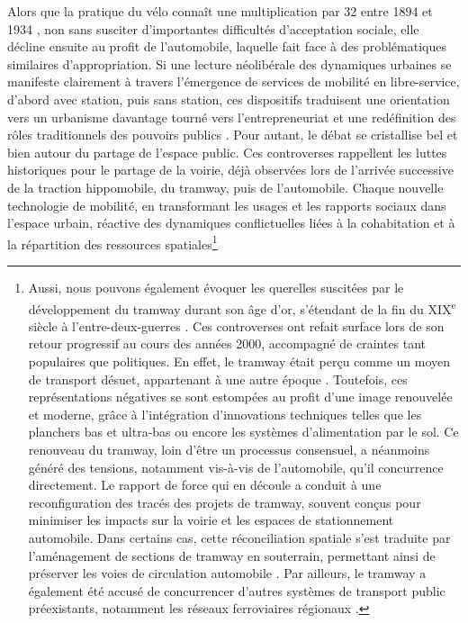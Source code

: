 \begin{refsegment}
Alors que la pratique du vélo connaît une multiplication par 32 entre 1894 et 1934 \textcolor{blue}{\autocite[139]{orselli_usages_2008}}, non sans susciter d’importantes difficultés d’acceptation sociale, elle décline ensuite au profit de l’automobile, laquelle fait face à des problématiques similaires d’appropriation. Si une lecture néolibérale des dynamiques urbaines se manifeste clairement à travers l’émergence de services de mobilité en libre-service, d’abord avec station, puis sans station, ces dispositifs traduisent une orientation vers un urbanisme davantage tourné vers l’entrepreneuriat et une redéfinition des rôles traditionnels des pouvoirs publics \textcolor{blue}{\autocites[169]{delaunay_mobilites_2017}{frotey_maxime_2017}}. Pour autant, le débat se cristallise bel et bien autour du partage de l'espace public. Ces controverses rappellent les luttes historiques pour le partage de la voirie, déjà observées lors de l’arrivée successive de la traction hippomobile, du tramway, puis de l’automobile. Chaque nouvelle technologie de mobilité, en transformant les usages et les rapports sociaux dans l’espace urbain, réactive des dynamiques conflictuelles liées à la cohabitation et à la répartition des ressources spatiales\footnote{
    Aussi, nous pouvons également évoquer les querelles suscitées par le développement du tramway durant son âge d’or, s’étendant de la fin du XIX\textsuperscript{e} siècle à l’entre-deux-guerres \textcolor{blue}{\autocite[281]{flonneau_concurrence_2007}}. Ces controverses ont refait surface lors de son retour progressif au cours des années 2000, accompagné de craintes tant populaires que politiques. En effet, le tramway était perçu comme un moyen de transport désuet, appartenant à une autre époque \textcolor{blue}{\autocite[110]{gardon__2014}}. Toutefois, ces représentations négatives se sont estompées au profit d’une image renouvelée et moderne, grâce à l’intégration d’innovations techniques telles que les planchers bas et ultra-bas ou encore les systèmes d’alimentation par le sol. Ce renouveau du tramway, loin d’être un processus consensuel, a néanmoins généré des tensions, notamment vis-à-vis de l’automobile, qu’il concurrence directement. Le rapport de force qui en découle a conduit à une reconfiguration des tracés des projets de tramway, souvent conçus pour minimiser les impacts sur la voirie et les espaces de stationnement automobile. Dans certains cas, cette réconciliation spatiale s’est traduite par l’aménagement de sections de tramway en souterrain, permettant ainsi de préserver les voies de circulation automobile \textcolor{blue}{\autocite[10]{richer_tramways_2012}}. Par ailleurs, le tramway a également été accusé de concurrencer d’autres systèmes de transport public préexistants, notamment les réseaux ferroviaires régionaux \textcolor{blue}{\autocite[36]{cete_nord_picardie_evaluer_2013}}.
}
\end{refsegment}
